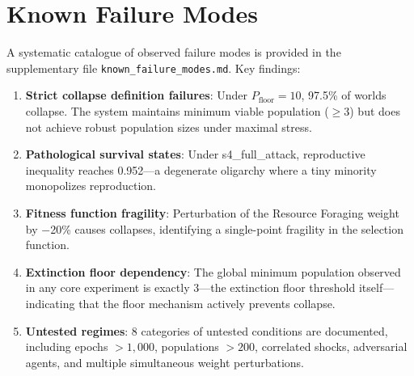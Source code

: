 \documentclass[11pt,a4paper]{article}
\begin{document}
\section{Known Failure Modes}\label{app:failures}

A systematic catalogue of observed failure modes is provided in the supplementary file \texttt{known\_failure\_modes.md}. Key findings:

\begin{enumerate}[nosep]
  \item \textbf{Strict collapse definition failures}: Under $P_{\text{floor}} = 10$, 97.5\% of worlds collapse. The system maintains minimum viable population ($\geq 3$) but does not achieve robust population sizes under maximal stress.

  \item \textbf{Pathological survival states}: Under s4\_full\_attack, reproductive inequality reaches 0.952---a degenerate oligarchy where a tiny minority monopolizes reproduction.

  \item \textbf{Fitness function fragility}: Perturbation of the Resource Foraging weight by $-$20\% causes collapses, identifying a single-point fragility in the selection function.

  \item \textbf{Extinction floor dependency}: The global minimum population observed in any core experiment is exactly 3---the extinction floor threshold itself---indicating that the floor mechanism actively prevents collapse.

  \item \textbf{Untested regimes}: 8 categories of untested conditions are documented, including epochs $> 1{,}000$, populations $> 200$, correlated shocks, adversarial agents, and multiple simultaneous weight perturbations.
\end{enumerate}
\end{document}
